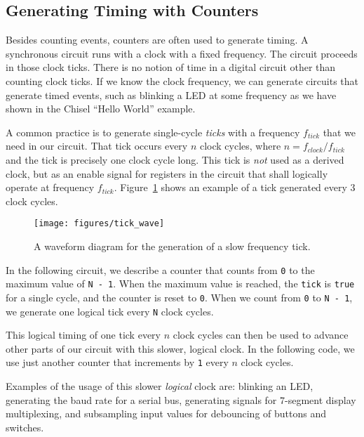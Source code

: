 \documentclass[%
    10pt,
    headinclude, footexclude,
    openright, %
    notitlepage,
    cleardoubleempty,
    headsepline,
    pointlessnumbers,
    bibtotoc, idxtotoc,
    ]{scrbook}
\newcommand{\code}[1]{{\small{\texttt{#1}}}}
\begin{document}
\subsection{Generating Timing with Counters}

Besides counting events, counters are often used to generate timing.
A synchronous circuit runs with a clock with a fixed frequency.
The circuit proceeds in those clock ticks. There is no notion of time in a digital
circuit other than counting clock ticks. If we know the clock frequency, we
can generate circuits that generate timed events, such as blinking a LED
at some frequency as we have shown in the Chisel ``Hello World'' example.

A common practice is to generate single-cycle \emph{ticks} with a frequency $f_{tick}$
that we need in our circuit. That tick occurs every $n$ clock cycles,
where $n = f_{clock}/f_{tick}$ and the tick is precisely one clock cycle long.
This tick is \emph{not} used as a derived clock, but as an enable signal for
registers in the circuit that shall logically operate at frequency $f_{tick}$.
Figure~\ref{fig:tick-wave} shows an example of a tick generated every
3 clock cycles.

\begin{figure}
  \centering
  \texttt{[image: figures/tick\_wave]}
  \caption{A waveform diagram for the generation of a slow frequency tick.}
  \label{fig:tick-wave}
\end{figure}


In the following circuit, we describe a counter that counts from \code{0}
to the maximum value of \code{N - 1}. When the maximum value is reached,
the \code{tick} is \code{true} for a single cycle, and the counter is reset to \code{0}.
When we count from \code{0} to \code{N - 1}, we generate one logical tick
every \code{N} clock cycles.


\noindent This logical timing of one tick every $n$ clock cycles can then be used
to advance other parts of our circuit with this slower, logical clock.
In the following code, we use just another counter that increments by \code{1}
every $n$ clock cycles.


Examples of the usage of this slower \emph{logical} clock are: blinking an LED,
generating the baud rate for a serial bus, generating signals for 7-segment
display multiplexing, and subsampling input values for debouncing of buttons
and switches. 
\end{document}

